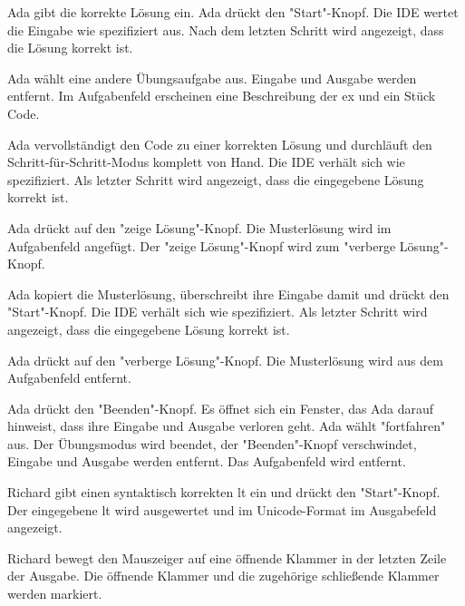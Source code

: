 \documentclass[parskip=full,11pt,twoside]{scrartcl}
\begin{document}
{Ada gibt die korrekte Lösung ein. Ada drückt den "Start"-Knopf.}
{Die IDE wertet die Eingabe wie spezifiziert aus.
 Nach dem letzten Schritt wird angezeigt, dass die Lösung korrekt ist.}
 
{Ada wählt eine andere Übungsaufgabe aus.}
{Eingabe und Ausgabe werden entfernt.
Im Aufgabenfeld erscheinen eine Beschreibung der \gls{ex} und ein Stück Code.}

{Ada vervollständigt den Code zu einer korrekten Lösung und durchläuft den Schritt-für-Schritt-Modus komplett von Hand.}
{Die IDE verhält sich wie spezifiziert.
 Als letzter Schritt wird angezeigt, dass die eingegebene Lösung korrekt ist.}

{Ada drückt auf den "zeige Lösung"-Knopf.}
{Die Musterlösung wird im Aufgabenfeld angefügt.
 Der "zeige Lösung"-Knopf wird zum "verberge Lösung"-Knopf.}

{Ada kopiert die Musterlösung, überschreibt ihre Eingabe damit und drückt den "Start"-Knopf.}
{Die IDE verhält sich wie spezifiziert. 
 Als letzter Schritt wird angezeigt, dass die eingegebene Lösung korrekt ist.}
 
{Ada drückt auf den "verberge Lösung"-Knopf.}
{Die Musterlösung wird aus dem Aufgabenfeld entfernt.}
 
{Ada drückt den "Beenden"-Knopf.}
{Es öffnet sich ein Fenster, das Ada darauf hinweist, dass ihre Eingabe und Ausgabe verloren geht.
 Ada wählt "fortfahren" aus.
 Der Übungsmodus wird beendet, der "Beenden"-Knopf verschwindet, Eingabe und Ausgabe werden entfernt.
 Das Aufgabenfeld wird entfernt.}


{Richard gibt einen syntaktisch korrekten \gls{lt} ein und drückt den "Start"-Knopf.}
{Der eingegebene \gls{lt} wird ausgewertet und im Unicode-Format im Ausgabefeld angezeigt.}

{Richard bewegt den Mauszeiger auf eine öffnende Klammer in der letzten Zeile der Ausgabe.}
{Die öffnende Klammer und die zugehörige schließende Klammer werden markiert.}
\end{document}
